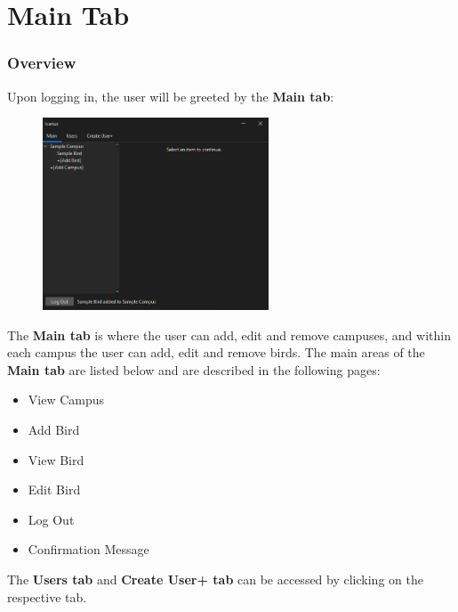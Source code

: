 \section{Main Tab}
\subsubsection{Overview}
Upon logging in, the user will be greeted by the \textbf{Main tab}: 
\begin{figure}[h]
    \centering
    \includegraphics[width=0.6\textwidth]{MainTab/mainTab.PNG}
\end{figure}

The \textbf{Main tab} is where the user can add, edit and remove campuses, and within each campus the user can add, edit and remove birds. The main areas of the \textbf{Main tab} are listed below and are described in the following pages:
\begin{itemize}
    \item View Campus
    \item Add Bird
    \item View Bird
    \item Edit Bird
    \item Log Out
    \item Confirmation Message
\end{itemize}
The \textbf{Users tab} and \textbf{Create User+ tab} can be accessed by clicking on the respective tab.

